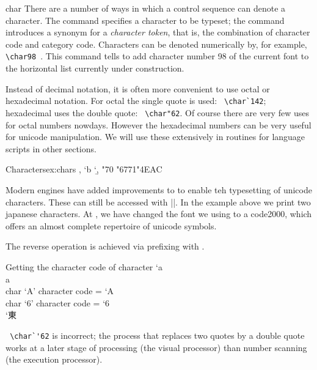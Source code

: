\begin{docCommand}{char}{}
There are a number of ways in which a control sequence can denote a character. The  command specifies a character to be typeset; the \cmd{\let} command introduces a synonym for a \emph{character
token}, that is, the combination of character code and category code.
\index{\string\char}
Characters can be denoted numerically by, for example, \verb+ \char98 +. This command tells \tex to add
character number 98 of the current font to the horizontal list currently under construction.

Instead of decimal notation, it is often more convenient to use octal or hexadecimal notation. For
octal the single quote is used: \verb+ \char`142+; hexadecimal uses the double quote: \verb+ \char"62+. Of course there are very few uses for octal numbers nowdays. However the hexadecimal numbers can be very useful for unicode manipulation. We will use these extensively in routines for language scripts in other sections.

\end{docCommand}

\begin{texexample}{Characters}{ex:chars}
, 
\char`b 
\char`\b,
\char"70
\bgroup
  \panunicode %
  \char"6771{}\char"4EAC
\egroup
\end{texexample}

Modern engines have added improvements to \tex to enable teh typesetting of unicode characters. These can still be accessed with |\char|. In the example above we print two japanese characters. At , we have changed the font we using to a code2000, which offers an almost complete repertoire of unicode symbols.

The reverse operation is achieved via prefixing with . 

\begin{texexample}{Getting the character code of character}{}
\number`a \\
\meaning a \\
\def\charnum#1{char `#1'  character code = \number`#1}
\charnum A\\
\charnum 6\\
{\panunicode\number`東 }
\end{texexample}

\verb+ \char`'62+  is incorrect; the process that replaces two quotes by a double quote works at a later
stage of processing (the visual processor) than number scanning (the execution processor).

